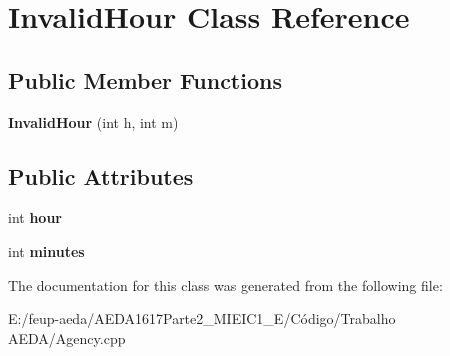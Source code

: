 \hypertarget{class_invalid_hour}{}\section{Invalid\+Hour Class Reference}
\label{class_invalid_hour}
\subsection*{Public Member Functions}
\begin{DoxyCompactItemize}
\item 
\mbox{\label{class_invalid_hour_aa69c39a6d6e2012fc1e908c81141f3bb}} 
{\bfseries Invalid\+Hour} (int h, int m)
\end{DoxyCompactItemize}
\subsection*{Public Attributes}
\begin{DoxyCompactItemize}
\item 
\mbox{\label{class_invalid_hour_ab0fd96c9274552f16757b1ef9c802b1a}} 
int {\bfseries hour}
\item 
\mbox{\label{class_invalid_hour_a4474b11b0d644762b773694d622b0ef1}} 
int {\bfseries minutes}
\end{DoxyCompactItemize}


The documentation for this class was generated from the following file\+:\begin{DoxyCompactItemize}
\item 
E\+:/feup-\/aeda/\+A\+E\+D\+A1617\+Parte2\+\_\+M\+I\+E\+I\+C1\+\_\+\+E/\+Código/\+Trabalho A\+E\+D\+A/Agency.\+cpp\end{DoxyCompactItemize}
